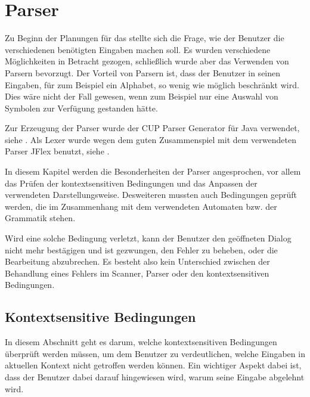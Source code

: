 

\chapter{Parser}\label{Parser}

Zu Beginn der Planungen für das \gtitool stellte sich die Frage, wie der
Benutzer die verschiedenen benötigten Eingaben machen soll. Es wurden
verschiedene Möglichkeiten in Betracht gezogen, schließlich wurde aber das
Verwenden von Parsern bevorzugt. Der Vorteil von Parsern ist, dass der Benutzer
in seinen Eingaben, für zum Beispiel ein Alphabet, so wenig wie möglich
beschränkt wird. Dies wäre nicht der Fall gewesen, wenn zum Beispiel nur eine
Auswahl von Symbolen zur Verfügung gestanden hätte.\vspace{10pt}

Zur Erzeugung der Parser wurde der CUP Parser Generator für Java verwendet, siehe
. Als Lexer wurde wegen dem guten Zusammenspiel mit dem
verwendeten Parser JFlex benutzt, siehe .\vspace{10pt}

In diesem Kapitel werden die Besonderheiten der Parser angesprochen, vor allem
das Prüfen der kontextsensitiven Bedingungen und das Anpassen der verwendeten
Darstellungsweise. Desweiteren mussten auch Bedingungen geprüft werden, die im
Zusammenhang mit dem verwendeten Automaten bzw. der Grammatik
stehen.\vspace{10pt}

Wird eine solche Bedingung verletzt, kann der Benutzer den geöffneten Dialog
nicht mehr bestägigen und ist gezwungen, den Fehler zu beheben, oder die
Bearbeitung abzubrechen. Es besteht also kein Unterschied zwischen der
Behandlung eines Fehlers im Scanner, Parser oder den kontextsensitiven
Bedingungen.


\section{Kontextsensitive Bedingungen}

In diesem Abschnitt geht es darum, welche kontextsensitiven Bedingungen
überprüft werden müssen, um dem Benutzer zu verdeutlichen, welche Eingaben
in aktuellen Kontext nicht getroffen werden können. Ein wichtiger Aspekt dabei
ist, dass der Benutzer dabei darauf hingewiesen wird, warum seine Eingabe
abgelehnt wird.\vspace{10pt}

